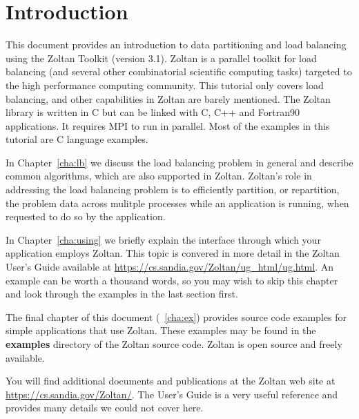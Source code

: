%
% 
%
\chapter{Introduction}

This document provides an introduction to data partitioning
and load balancing using the Zoltan Toolkit (version 3.1).  
Zoltan is a parallel toolkit for load balancing
(and several other combinatorial scientific computing tasks) 
targeted to the high performance computing community.  
This tutorial only covers load balancing,
and other capabilities in Zoltan are barely mentioned.
The Zoltan library is written in C but can be
linked with C, C++ and Fortran90 applications.  
It requires MPI to run in parallel.
Most of the examples in this tutorial are C language examples.

In Chapter~\ref{cha:lb} we
discuss the load balancing problem in general and describe
common algorithms, which are also supported in Zoltan.
Zoltan's role in addressing the load balancing problem is to 
efficiently partition,
or repartition, the problem data across mulitple processes while an
application is running, when requested to do so by the application.


In Chapter~\ref{cha:using} we briefly explain the interface
through which your application employs Zoltan.  This topic is
convered in more detail in the
Zoltan User's Guide available at
\url{https://cs.sandia.gov/Zoltan/ug_html/ug.html}.
An example can be worth a thousand words, so you may wish to 
skip this chapter and look through the examples in the last section first.

The final chapter of this document (~\ref{cha:ex}) provides
source code examples for simple applications that use Zoltan.
These examples may be found in the \textbf{examples} directory
of the Zoltan source code.  Zoltan is open source and freely available.

You will find additional documents and publications at the
Zoltan web site at \url{https://cs.sandia.gov/Zoltan/}.
The User's Guide is a very useful reference and provides
many details we could not cover here.

